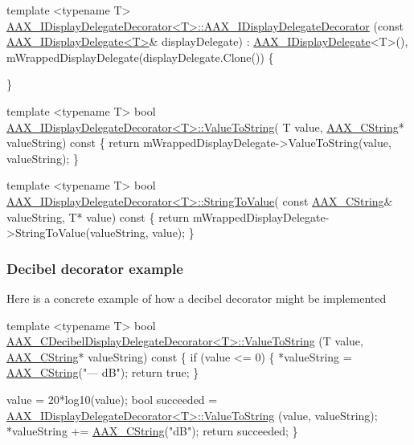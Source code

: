 \begin{DoxyCode}
\textcolor{keyword}{template} <\textcolor{keyword}{typename} T>
\hyperlink{a00094}{AAX\_IDisplayDelegateDecorator<T>::AAX\_IDisplayDelegateDecorator}
      (\textcolor{keyword}{const} \hyperlink{a00092}{AAX\_IDisplayDelegate<T>}& displayDelegate)  :
    \hyperlink{a00092}{AAX\_IDisplayDelegate}<T>(),
    mWrappedDisplayDelegate(displayDelegate.Clone())
\{

\}

\textcolor{keyword}{template} <\textcolor{keyword}{typename} T>
\textcolor{keywordtype}{bool}        \hyperlink{a00094_ada5780cfa332ac7946bf95aa65ae96f5}{AAX\_IDisplayDelegateDecorator<T>::ValueToString}(
      T value, \hyperlink{a00042}{AAX\_CString}* valueString)\textcolor{keyword}{ const }
\textcolor{keyword}{}\{
    \textcolor{keywordflow}{return} mWrappedDisplayDelegate->ValueToString(value, valueString);
\}

\textcolor{keyword}{template} <\textcolor{keyword}{typename} T>
\textcolor{keywordtype}{bool}        \hyperlink{a00094_a18d19293f3eca619cb5bb7f1ffde1a8d}{AAX\_IDisplayDelegateDecorator<T>::StringToValue}(\textcolor{keyword}{
      const} \hyperlink{a00042}{AAX\_CString}& valueString, T* value)\textcolor{keyword}{ const}
\textcolor{keyword}{}\{
    \textcolor{keywordflow}{return} mWrappedDisplayDelegate->StringToValue(valueString, value);
\}
\end{DoxyCode}
\hypertarget{a00346_example}{}\subsubsection{Decibel decorator example}\label{a00346_example}
Here is a concrete example of how a decibel decorator might be implemented


\begin{DoxyCode}
\textcolor{keyword}{template} <\textcolor{keyword}{typename} T>
\textcolor{keywordtype}{bool}    \hyperlink{a00015_a147cb1d0b62b0a62c6e3bb98daf80027}{AAX\_CDecibelDisplayDelegateDecorator<T>::ValueToString}
      (T value, \hyperlink{a00042}{AAX\_CString}* valueString)\textcolor{keyword}{ const }
\textcolor{keyword}{}\{
    \textcolor{keywordflow}{if} (value <= 0)
    \{
         *valueString = \hyperlink{a00042}{AAX\_CString}(\textcolor{stringliteral}{"--- dB"});
        \textcolor{keywordflow}{return} \textcolor{keyword}{true};
    \}
    
    value = 20*log10(value);
    \textcolor{keywordtype}{bool} succeeded = \hyperlink{a00094_ada5780cfa332ac7946bf95aa65ae96f5}{AAX\_IDisplayDelegateDecorator<T>::ValueToString}
      (value, valueString);
     *valueString += \hyperlink{a00042}{AAX\_CString}(\textcolor{stringliteral}{"dB"});
    \textcolor{keywordflow}{return} succeeded;
\}
\end{DoxyCode}


